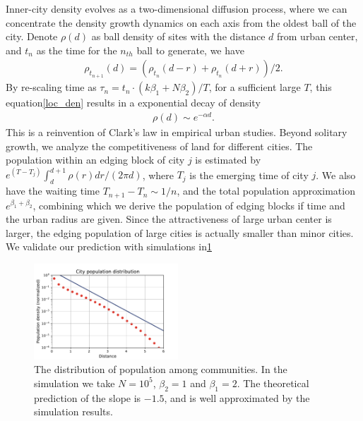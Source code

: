 \documentclass[reprint,unsortedaddress,amsmath,amssymb,aps,prl,fixfloat,showkeys]{revtex4-2}
\begin{document}

Inner-city density evolves as a two-dimensional diffusion process\cite{doi:10.1137/0150099}, where we can concentrate the density growth dynamics on each axis from the oldest ball of the city. Denote $\rho(d)$ as ball density of sites with the distance $d$ from urban center, and $t_n$ as the time for the $n_{th}$ ball to generate, we have \begin{align}\rho_{t_{n+1}}(d) = (\rho_{t_{n}}(d-r) + \rho_{t_{n}}(d+r) )/2.\label{loc_den}\end{align} By re-scaling time as $\tau_n = t_n\cdot (k\beta_1+N\beta_2)/T$, for a sufficient large $T$, this equation\@s\ref{loc_den} results in a exponential decay of density
    \begin{align}
        \rho(d)\sim e^{-\alpha d}\label{clark_eq}.
    \end{align}
This is a reinvention of Clark's law in empirical urban studies\cite{clark1951urban}. Beyond solitary growth, we analyze the competitiveness of land for different cities. The population within an edging block of city $j$ is estimated by $e^{(T-T_j)}\int_{d}^{d+1}\rho(r)dr/(2\pi d)$, where $T_j$ is the emerging time of city $j$. We also have the waiting time $T_{n+1}-T_{n}\sim 1/n$, and the total population approximation $e^{\beta_1+\beta_2}$, combining which we derive the population of edging blocks if time and the urban radius are given. Since the attractiveness of large urban center is larger, the edging population of large cities is actually smaller than minor cities. We validate our prediction with simulations in\@\ref{fig:clark} %

\begin{figure}
    \centering
    \includegraphics[width=0.48\textwidth]{pics/kernal_density.pdf}
    \caption{The distribution of population among communities. In the simulation we take $N = 10^5$, $\beta_2=1$ and $\beta_1 = 2$. The theoretical prediction of the slope is $-1.5$, and is well approximated by the simulation results.}
    \label{fig:clark}
\end{figure}
\end{document}

